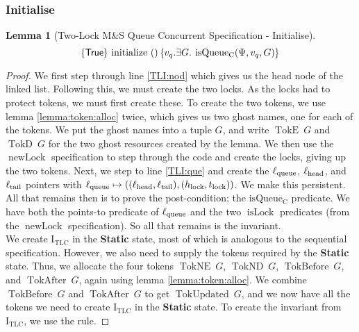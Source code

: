 \documentclass[a4paper, 10pt]{report}
\theoremstyle{definition}
\newtheorem{lemma}[theorem]{Lemma}
\newcommand{\isLock}{\operatorname{isLock}}
\newcommand{\newLock}{\operatorname{newLock}}
\newcommand{\initialise}{\operatorname{initialize}}
\newcommand{\msq}{M\&S Queue}
\newcommand{\tlmsq}{Two-Lock \msq{}}
\newcommand{\isqueueconc}{\operatorname{isQueue_{C}}}
\newcommand{\TLQueueInvariantConc}{\operatorname{I_{TLC}}}
\newcommand{\vq}{v_q}
\newcommand{\locN}[1]{\loc_{\mathrm{#1}}}
\newcommand{\lochead}{\locN{head}}
\newcommand{\loctail}{\locN{tail}}
\newcommand{\locqueue}{\locN{queue}}
\newcommand{\Hlock}{h_{\mathrm{lock}}}
\newcommand{\Tlock}{t_{\mathrm{lock}}}
\newcommand{\StaticState}{\textbf{Static}\xspace}
\newcommand{\Qg}{G}
\newcommand{\TokE}[1]{\operatorname{TokE} ~ #1}
\newcommand{\TokEQg}{\TokE{\Qg}}
\newcommand{\TokNE}[1]{\operatorname{TokNE} ~ #1}
\newcommand{\TokNEQg}{\TokNE{\Qg}}
\newcommand{\TokD}[1]{\operatorname{TokD} ~ #1}
\newcommand{\TokDQg}{\TokD{\Qg}}
\newcommand{\TokND}[1]{\operatorname{TokND} ~ #1}
\newcommand{\TokNDQg}{\TokND{\Qg}}
\newcommand{\TokBefore}[1]{\operatorname{TokBefore} ~ #1}
\newcommand{\TokBeforeQg}{\TokBefore{\Qg}}
\newcommand{\TokAfter}[1]{\operatorname{TokAfter} ~ #1}
\newcommand{\TokAfterQg}{\TokAfter{\Qg}}
\newcommand{\TokUpdated}[1]{\operatorname{TokUpdated} ~ #1}
\newcommand{\TokUpdatedQg}{\TokUpdated{\Qg}}
\newcommand{\concspecinitHTGen}[3]{\hoare{\TRUE}{\initialise \ \TT}{#2 . \Exists #3. \isqueueconc(#1, #2, #3)}}
\newcommand{\concspecinitGen}[3]{\concspecinitHTGen{#1}{#2}{#3}}
\newcommand{\concspecinit}[1]{\concspecinitGen{#1}{\vq}{\Qg}}
\begin{document}
\subsubsection{Initialise}
\begin{lemma}[\tlmsq{} Concurrent Specification - Initialise]\label{TLMSQ:spec:conc:init}
  \begin{equation*}
    \concspecinit{\Psi}
  \end{equation*}
\end{lemma}
\begin{proof}
We first step through line \ref{TLI:nod} which gives us the head node of the linked list. Following this, we must create the two locks. As the locks had to protect tokens, we must first create these. To create the two tokens, we use lemma \ref{lemma:token:alloc} twice, which gives us two ghost names, one for each of the tokens. We put the ghost names into a tuple $\Qg$, and write $\TokEQg$ and $\TokDQg$ for the two ghost resources created by the lemma. We then use the $\newLock$ specification to step through the code and create the locks, giving up the two tokens. Next, we step to line \ref{TLI:que} and create the $\locqueue$, $\lochead$, and $\loctail$ pointers with $\locqueue \mapsto ((\lochead, \loctail), (\Hlock, \Tlock))$. We make this persistent.\\
All that remains then is to prove the post-condition; the $\isqueueconc$ predicate. We have both the points-to predicate of $\locqueue$ and the two $\isLock$ predicates (from the $\newLock$ specification). So all that remains is the invariant.\\
We create $\TLQueueInvariantConc$ in the \StaticState state, most of which is analogous to the sequential specification. However, we also need to supply the tokens required by the \StaticState state. Thus, we allocate the four tokens $\TokNEQg$, $\TokNDQg$, $\TokBeforeQg$, and $\TokAfterQg$, again using lemma \ref{lemma:token:alloc}. We combine $\TokBeforeQg$ and $\TokAfterQg$ to get $\TokUpdatedQg$, and we now have all the tokens we need to create $\TLQueueInvariantConc$ in the \StaticState state. To create the invariant from $\TLQueueInvariantConc$, we use the  rule.
\end{proof}
\end{document}
